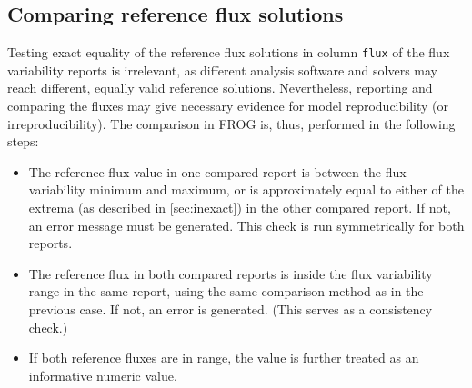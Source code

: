 \subsection{Comparing reference flux solutions}
\label{sec:cmpreference}

Testing exact equality of the reference flux solutions in column \texttt{flux} of the flux variability reports is irrelevant, as different analysis software and solvers may reach different, equally valid reference solutions.
Nevertheless, reporting and comparing the fluxes may give necessary evidence for model reproducibility (or irreproducibility).
The comparison in FROG is, thus, performed in the following steps:
\begin{itemize}
\item The reference flux value in one compared report is between the flux variability minimum and maximum, or is approximately equal to either of the extrema (as described in \cref{sec:inexact}) in the other compared report.
If not, an error message must be generated. This check is run symmetrically for both reports.

\item The reference flux in both compared reports is inside the flux variability range in the same report, using the same comparison method as in the previous case. If not, an error is generated. (This serves as a consistency check.)

\item If both reference fluxes are in range, the value is further treated as an informative numeric value.
\end{itemize}
